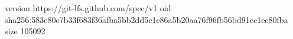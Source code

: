 version https://git-lfs.github.com/spec/v1
oid sha256:583e80e7b33f683f36afba5bb2dd5c1c86a5b20aa76f96fb56bd91cc1ee80fba
size 105092
